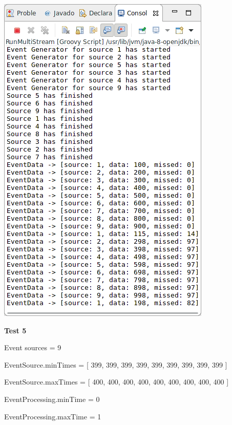 \includegraphics[width=\textwidth/2]{img/screenshots/9-2-4.png}

\textbf{Test 5}

Event sources = 9

EventSource.minTimes = [ 399, 399, 399, 399, 399, 399, 399, 399, 399 ]

EventSource.maxTimes = [ 400, 400, 400, 400, 400, 400, 400, 400, 400 ]

EventProcessing.minTime = 0

EventProcessing.maxTime = 1

